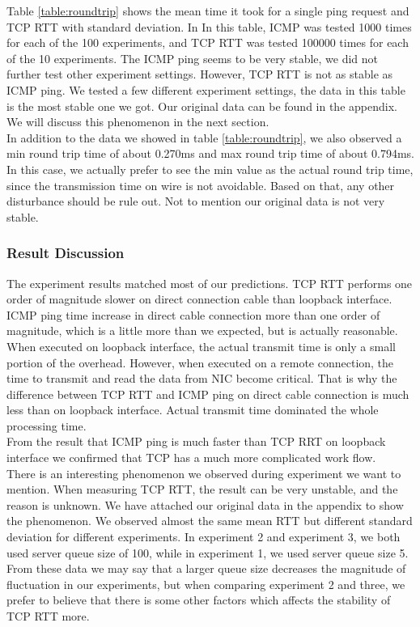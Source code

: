 \documentclass{article} %
\begin{document}
Table \ref{table:roundtrip} shows the mean time it took for a single ping request and TCP RTT with standard deviation. In In this table, ICMP was tested 1000 times for each of the 100 experiments, and TCP RTT was tested 100000 times for each of the 10 experiments. The ICMP ping seems to be very stable, we did not further test other experiment settings. However, TCP RTT is not as stable as ICMP ping. We tested a few different experiment settings, the data in this table is the most stable one we got. Our original data can be found in the appendix. We will discuss this phenomenon in the next section. \\
In addition to the data we showed in table \ref{table:roundtrip}, we also observed a min round trip time of about 0.270ms and max round trip time of about 0.794ms. In this case, we actually prefer to see the min value as the actual round trip time, since the transmission time on wire is not avoidable. Based on that, any other disturbance should be rule out. Not to mention our original data is not very stable.\\

\subsubsection{Result Discussion}
The experiment results matched most of our predictions. TCP RTT performs one order of magnitude slower on direct connection cable than loopback interface. ICMP ping time increase in direct cable connection more than one order of magnitude, which is a little more than we expected, but is actually reasonable. When executed on loopback interface, the actual transmit time is only a small portion of the overhead. However, when executed on a remote connection, the time to transmit and read the data from NIC become critical. That is why the difference between TCP RTT and ICMP ping on direct cable connection is much less than on loopback interface. Actual transmit time dominated the whole processing time.\\
From the result that ICMP ping is much faster than TCP RRT on loopback interface we confirmed that TCP has a much more complicated work flow.\\
There is an interesting phenomenon we observed during experiment we want to mention. When measuring TCP RTT, the result can be very unstable, and the reason is unknown. We have attached our original data in the appendix to show the phenomenon. We observed almost the same mean RTT but different standard deviation for different experiments. In experiment 2 and experiment 3, we both used server queue size of 100, while in experiment 1, we used server queue size 5. From these data we may say that a larger queue size decreases the magnitude of fluctuation in our experiments, but when comparing experiment 2 and three, we prefer to believe that there is some other factors which affects the stability of TCP RTT more. \\
\end{document}
